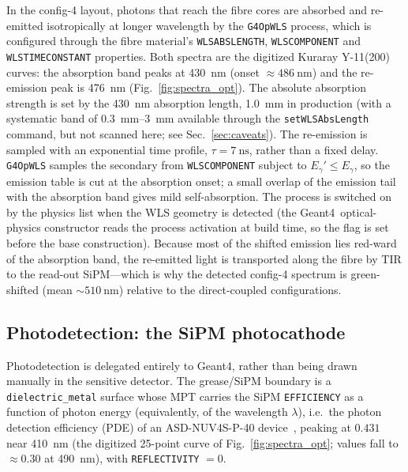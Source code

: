 \documentclass[11pt,a4paper]{article}
\newcommand{\gfour}{Geant4}
\begin{document}
In the config-4 layout, photons that reach the fibre cores are absorbed and
re-emitted isotropically at longer wavelength by the \texttt{G4OpWLS} process,
which is configured through the fibre material's \texttt{WLSABSLENGTH},
\texttt{WLSCOMPONENT} and \texttt{WLSTIMECONSTANT} properties. Both spectra are
the digitized Kuraray Y-11(200) curves: the absorption band peaks at
\SI{430}{\nano\meter} (onset $\approx\SI{486}{\nano\meter}$) and the re-emission
peak is \SI{476}{\nano\meter} (Fig.~\ref{fig:spectra_opt}). The absolute
absorption strength is set by the \SI{430}{\nano\meter} absorption length,
\SI{1.0}{\milli\meter} in production (with a systematic band of
\SIrange{0.3}{3}{\milli\meter} available through the
\texttt{setWLSAbsLength} command, but not scanned here; see
Sec.~\ref{sec:caveats}). The re-emission is sampled with an
exponential time profile, $\tau = \SI{7}{\nano\second}$, rather than a fixed
delay. \texttt{G4OpWLS} samples the secondary from \texttt{WLSCOMPONENT} subject
to $E_\gamma' \le E_\gamma$, so the emission table is cut at the absorption
onset; a small overlap of the emission tail with the absorption band gives mild
self-absorption. The process is switched on by the physics list when the WLS
geometry is detected (the \gfour\ optical-physics constructor reads the process
activation at build time, so the flag is set before the base construction).
Because most of the shifted emission lies red-ward of the absorption band, the
re-emitted light is transported along the fibre by TIR to the read-out
SiPM---which is why the detected config-4 spectrum is green-shifted (mean
$\sim\!\SI{510}{\nano\meter}$) relative to the direct-coupled configurations.

\subsection{Photodetection: the SiPM photocathode}

Photodetection is delegated entirely to \gfour, rather than being drawn
manually in the sensitive detector. The grease/SiPM boundary is a
\texttt{dielectric\_metal} surface whose MPT carries the SiPM
\texttt{EFFICIENCY} as a function of photon energy (equivalently, of the
wavelength $\lambda$), i.e.\ the photon detection
efficiency (PDE) of an ASD-NUV4S-P-40 device~\cite{AdvanSiD_NUV}, peaking at
$0.431$ near \SI{410}{\nano\meter} (the digitized 25-point curve of
Fig.~\ref{fig:spectra_opt}; values fall to $\approx 0.30$ at
\SI{490}{\nano\meter}), with \texttt{REFLECTIVITY} $=0$.
\end{document}
